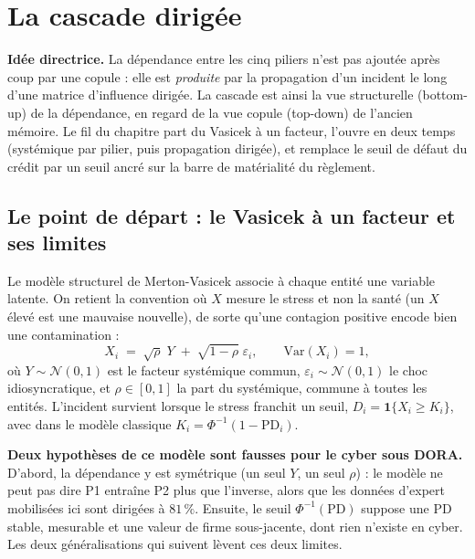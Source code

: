 \chapter{La cascade dirigée}
\label{chap:cascade}

\begin{cle}
\textbf{Idée directrice.} La dépendance entre les cinq piliers n'est pas ajoutée après coup par
une copule : elle est \emph{produite} par la propagation d'un incident le long d'une matrice
d'influence dirigée. La cascade est ainsi la vue structurelle (bottom-up) de la
dépendance, en regard de la vue copule (top-down) de l'ancien mémoire. Le fil du
chapitre part du Vasicek à un facteur, l'ouvre en deux temps (systémique par pilier, puis
propagation dirigée), et remplace le seuil de défaut du crédit par un seuil ancré sur la barre
de matérialité du règlement.
\end{cle}

\section{Le point de départ : le Vasicek à un facteur et ses limites}

Le modèle structurel de Merton-Vasicek associe à chaque entité une variable latente. On retient
la convention où $X$ mesure le stress et non la santé (un $X$ élevé est une mauvaise
nouvelle), de sorte qu'une contagion positive encode bien une contamination :
\begin{equation}
X_i \;=\; \sqrt{\rho}\;Y \;+\; \sqrt{1-\rho}\;\varepsilon_i, \qquad \mathrm{Var}(X_i)=1,
\end{equation}
où $Y\sim\mathcal N(0,1)$ est le facteur systémique commun, $\varepsilon_i\sim\mathcal N(0,1)$ le
choc idiosyncratique, et $\rho\in[0,1]$ la part du systémique, commune à toutes les entités.
L'incident survient lorsque le stress franchit un seuil, $D_i=\mathbf 1\{X_i\ge K_i\}$, avec dans
le modèle classique $K_i=\Phi^{-1}(1-\mathrm{PD}_i)$.

\begin{attention}
\textbf{Deux hypothèses de ce modèle sont fausses pour le cyber sous DORA.} D'abord, la
dépendance y est symétrique (un seul $Y$, un seul $\rho$) : le modèle ne peut pas dire
\og P1 entraîne P2 plus que l'inverse\fg{}, alors que les données d'expert mobilisées ici
sont dirigées à $81\,\%$. Ensuite, le seuil $\Phi^{-1}(\mathrm{PD})$ suppose une PD stable, mesurable et
une valeur de firme sous-jacente, dont rien n'existe en cyber. Les deux généralisations qui
suivent lèvent ces deux limites.
\end{attention}

